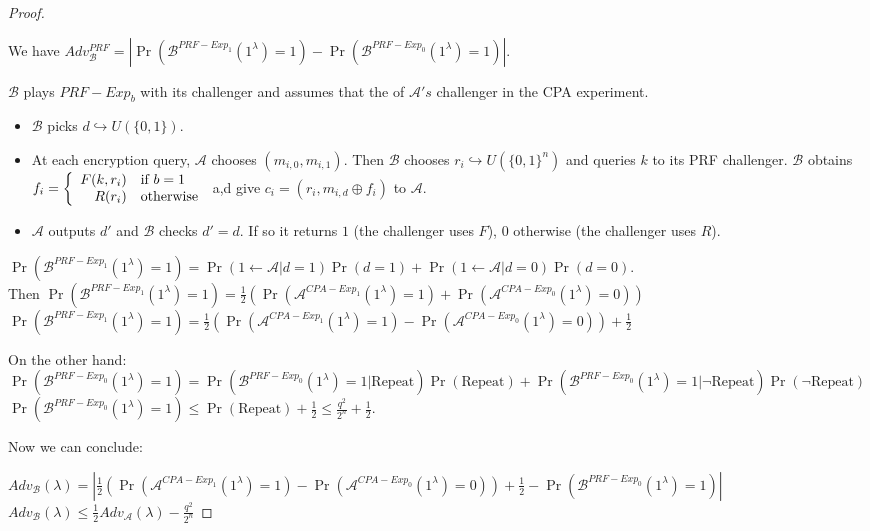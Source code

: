 \documentclass{article}
\newcommand{\A}{\mathcal{A}}
\newcommand{\B}{\mathcal{B}}
\newcommand{\half}{\frac{1}{2}}
\newcommand{\bit}{\{0,1\}}
\begin{document}
\begin{proof}
\begin{center}
\end{center}

We have $Adv^{PRF}_\B=|\Pr(\B^{PRF-Exp_1}(1^\lambda)=1)-\Pr(\B^{PRF-Exp_0}(1^\lambda)=1)|$.

$\B$ plays $PRF-Exp_b$ with its challenger and assumes that the of $\A's$ challenger in the CPA experiment.
\begin{itemize}
\item $\B$ picks $d\hookrightarrow U(\bit)$.
\item At each encryption query, $\A$ chooses $(m_{i,0},m_{i,1})$. Then $\B$ chooses $r_i\hookrightarrow U(\bit^n)$ and queries $k$ to its PRF challenger. $\B$ obtains $f_i=\left\{\begin{array}{r l}
F(k,r_i) & \text{if $b=1$}\\
R(r_i) &\text{otherwise}
\end{array}\right.$ a,d give $c_i=(r_i,m_{i,d}\oplus f_i)$ to $\A$.
\item $\A$ outputs $d'$ and $\B$ checks $d'=d$. If so it returns $1$ (the challenger uses $F$), $0$ otherwise (the challenger uses $R$).
\end{itemize} 


$\Pr(\B^{PRF-Exp_1}(1^\lambda)=1)=\Pr(1\leftarrow\A|d=1)\Pr(d=1)+\Pr(1\leftarrow\A|d=0)\Pr(d=0)$.\\
Then $\Pr(\B^{PRF-Exp_1}(1^\lambda)=1)=\half(\Pr(\A^{CPA-Exp_1}(1^\lambda)=1)+\Pr(\A^{CPA-Exp_0}(1^\lambda)=0))$\\
$\Pr(\B^{PRF-Exp_1}(1^\lambda)=1)=\half(\Pr(\A^{CPA-Exp_1}(1^\lambda)=1)-\Pr(\A^{CPA-Exp_0}(1^\lambda)=0))+\half$

On the other hand:\\
$\Pr(\B^{PRF-Exp_0}(1^\lambda)=1)=\Pr(\B^{PRF-Exp_0}(1^\lambda)=1|\text{Repeat})\Pr(\text{Repeat})+\Pr(\B^{PRF-Exp_0}(1^\lambda)=1|\neg\text{Repeat})\Pr(\neg\text{Repeat})$
$\Pr(\B^{PRF-Exp_0}(1^\lambda)=1)\leq \Pr(\text{Repeat})+\half\leq \frac{q^2}{2^n}+\half$.

Now we can conclude:

$Adv_\B(\lambda)=|\half(\Pr(\A^{CPA-Exp_1}(1^\lambda)=1)-\Pr(\A^{CPA-Exp_0}(1^\lambda)=0))+\half-\Pr(\B^{PRF-Exp_0}(1^\lambda)=1)|$\\
$Adv_\B(\lambda)\leq \half Adv_\A(\lambda)-\frac{q^2}{2^n}$
\end{proof}
\end{document}
